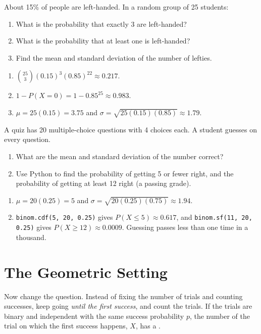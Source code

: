 \begin{Exercise}[title={Lefties}, label=bg_lefty]
About 15\% of people are left-handed. In a random group of 25 students:
\begin{enumerate}
\item What is the probability that exactly 3 are left-handed?
\item What is the probability that at least one is left-handed?
\item Find the mean and standard deviation of the number of lefties.
\end{enumerate}
\end{Exercise}
\begin{Answer}[ref=bg_lefty]
\begin{enumerate}
\item $\binom{25}{3}(0.15)^3(0.85)^{22} \approx 0.217$.
\item $1 - P(X = 0) = 1 - 0.85^{25} \approx 0.983$.
\item $\mu = 25(0.15) = 3.75$ and $\sigma = \sqrt{25(0.15)(0.85)} \approx 1.79$.
\end{enumerate}
\end{Answer}

\begin{Exercise}[title={Just Guessing}, label=bg_guess]
A quiz has 20 multiple-choice questions with 4 choices each. A student guesses on every
question.
\begin{enumerate}
\item What are the mean and standard deviation of the number correct?
\item Use Python to find the probability of getting 5 or fewer right, and the probability
of getting at least 12 right (a passing grade).
\end{enumerate}
\end{Exercise}
\begin{Answer}[ref=bg_guess]
\begin{enumerate}
\item $\mu = 20(0.25) = 5$ and $\sigma = \sqrt{20(0.25)(0.75)} \approx 1.94$.
\item \texttt{binom.cdf(5, 20, 0.25)} gives $P(X \leq 5) \approx 0.617$, and
\texttt{binom.sf(11, 20, 0.25)} gives $P(X \geq 12) \approx 0.0009$. Guessing
passes less than one time in a thousand.
\end{enumerate}
\end{Answer}

\section{The Geometric Setting}
Now change the question. Instead of fixing the number of trials and counting
successes, keep going \emph{until the first success}, and count the trials. If the trials
are binary and independent with the same success probability $p$, the number of the
trial on which the first success happens, $X$, has a .

